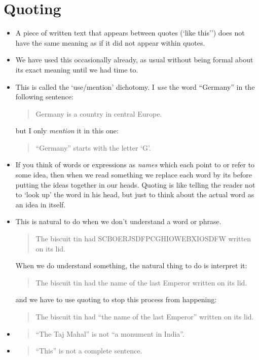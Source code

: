 \chapter{Quoting}
\label{quoting}
\depends{}

\begin{itemize}
\item
A piece of written text that appears between quotes (`like this'') does not have the same meaning as if it did not appear within quotes. 
\item
We have used this occasionally already, as usual without being formal about its exact meaning until we had time to.
\item
This is called the `use/mention' dichotomy. I \emph{use} the word ``Germany'' in the following sentence:
\begin{quote}
Germany is a country in central Europe.
\end{quote}
but I only \emph{mention} it in this one:
\begin{quote}
``Germany'' starts with the letter `G'.
\end{quote}
\item
If you think of words or expressions as \emph{names} which each point to or refer to some idea, then when we read something we replace each word by its  before putting the ideas together in our heads. Quoting is like telling the reader not to `look up' the word in his head, but just to think about the actual word as an idea in itself.
\item
This is natural to do when we don't understand a word or phrase.
\begin{quote}
The biscuit tin had SCBOERJSDFPCGHIOWEBXIOSDFW written on its lid.
\end{quote}
When we do understand something, the natural thing to do is interpret it:
\begin{quote}
The biscuit tin had the name of the last Emperor written on its lid.
\end{quote}
and we have to use quoting to stop this process from happening:
\begin{quote}
The biscuit tin had ``the name of the last Emperor'' written on its lid.
\end{quote}
\item
\begin{quote}
``The Taj Mahal'' is not ``a monument in India''.
\end{quote}
\item
\begin{quote}
``This'' is not a complete sentence.
\end{quote}
\end{itemize}
